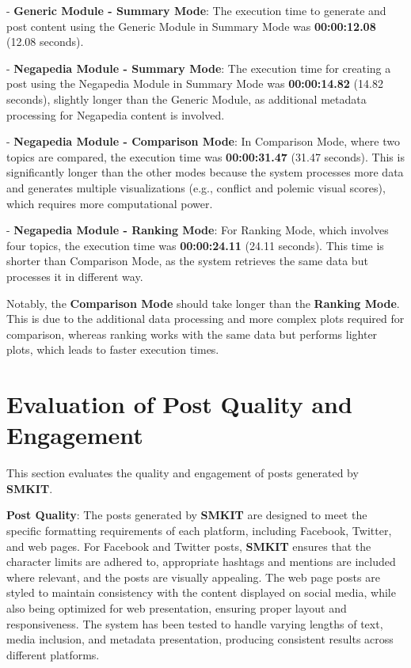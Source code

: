 - \textbf{Generic Module - Summary Mode}: The execution time to generate and post content using the Generic Module in Summary Mode was \textbf{00:00:12.08} (12.08 seconds).

- \textbf{Negapedia Module - Summary Mode}: The execution time for creating a post using the Negapedia Module in Summary Mode was \textbf{00:00:14.82} (14.82 seconds), slightly longer than the Generic Module, as additional metadata processing for Negapedia content is involved.

- \textbf{Negapedia Module - Comparison Mode}: In Comparison Mode, where two topics are compared, the execution time was \textbf{00:00:31.47} (31.47 seconds). This is significantly longer than the other modes because the system processes more data and generates multiple visualizations (e.g., conflict and polemic visual scores), which requires more computational power.

- \textbf{Negapedia Module - Ranking Mode}: For Ranking Mode, which involves four topics, the execution time was \textbf{00:00:24.11} (24.11 seconds). This time is shorter than Comparison Mode, as the system retrieves the same data but processes it in different way.

Notably, the \textbf{Comparison Mode} should take longer than the \textbf{Ranking Mode}. This is due to the additional data processing and more complex plots required for comparison, whereas ranking works with the same data but performs lighter plots, which leads to faster execution times.


\section{Evaluation of Post Quality and Engagement}
\label{sec:evaluation_of_post_quality_and_engagement}
This section evaluates the quality and engagement of posts generated by \textbf{SMKIT}. 

\textbf{Post Quality}: The posts generated by \textbf{SMKIT} are designed to meet the specific formatting requirements of each platform, including Facebook, Twitter, and web pages. For Facebook and Twitter posts, \textbf{SMKIT} ensures that the character limits are adhered to, appropriate hashtags and mentions are included where relevant, and the posts are visually appealing. The web page posts are styled to maintain consistency with the content displayed on social media, while also being optimized for web presentation, ensuring proper layout and responsiveness. The system has been tested to handle varying lengths of text, media inclusion, and metadata presentation, producing consistent results across different platforms.

